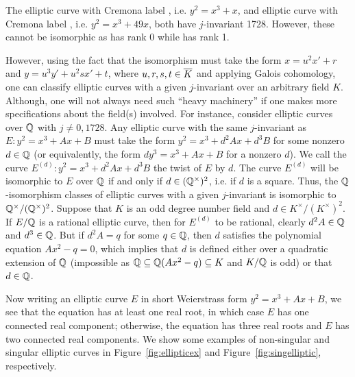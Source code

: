 \begin{ex}
The elliptic curve with Cremona label \sfaf{}, i.e. $y^2= x^3 + x$, and elliptic curve with Cremona label \totsto{}, i.e. $y^2= x^3 + 49x$, both have $j$-invariant 1728. However, these cannot be isomorphic as \sfaf{} has rank 0 while \totsto{} has rank 1.
\end{ex}


However, using the fact that the isomorphism must take the form $x= u^2x' + r$ and $y= u^3y' + u^2sx' + t$, where $u,r,s,t \in \overline{K}$ and applying Galois cohomology, one can classify elliptic curves with a given $j$-invariant over an arbitrary field $K$. Although, one will not always need such ``heavy machinery'' if one makes more specifications about the field(s) involved. For instance, consider elliptic curves over $\mathbb{Q}$ with $j \neq 0, 1728$. Any elliptic curve with the same $j$-invariant as $E: y^2= x^3 + Ax + B$ must take the form $y^2= x^3 + d^2Ax + d^3B$ for some nonzero $d \in \mathbb{Q}$ (or equivalently, the form $dy^3= x^3 + Ax + B$ for a nonzero $d$). We call the curve $E^{(d)}: y^2= x^3 + d^2Ax + d^3B$ the twist of $E$ by $d$. The curve $E^{(d)}$ will be isomorphic to $E$ over $\mathbb{Q}$ if and only if $d \in (\mathbb{Q}^\times)^2$, i.e. if $d$ is a square. Thus, the $\mathbb{Q}$-isomorphism classes of elliptic curves with a given $j$-invariant is isomorphic to $\mathbb{Q}^\times/(\mathbb{Q}^\times)^2$. Suppose that $K$ is an odd degree number field and $d \in K^\times/(K^\times)^2$. If $E/\mathbb{Q}$ is a rational elliptic curve, then for $E^{(d)}$ to be rational, clearly $d^2A \in \mathbb{Q}$ and $d^3 \in \mathbb{Q}$. But if $d^2A= q$ for some $q \in \mathbb{Q}$, then $d$ satisfies the polynomial equation $Ax^2 - q= 0$, which implies that $d$ is defined either over a quadratic extension of $\mathbb{Q}$ (impossible as $\mathbb{Q} \subseteq \mathbb{Q}(Ax^2 -q) \subseteq K$ and $K/\mathbb{Q}$ is odd) or that $d \in \mathbb{Q}$. 


Now writing an elliptic curve $E$ in short Weierstrass form $y^2= x^3 + Ax + B$, we see that the equation has at least one real root, in which case $E$ has one connected real component; otherwise, the equation has three real roots and $E$ has two connected real components. We show some examples of non-singular and singular elliptic curves in Figure~\ref{fig:ellipticex} and Figure~\ref{fig:singelliptic}, respectively.  



